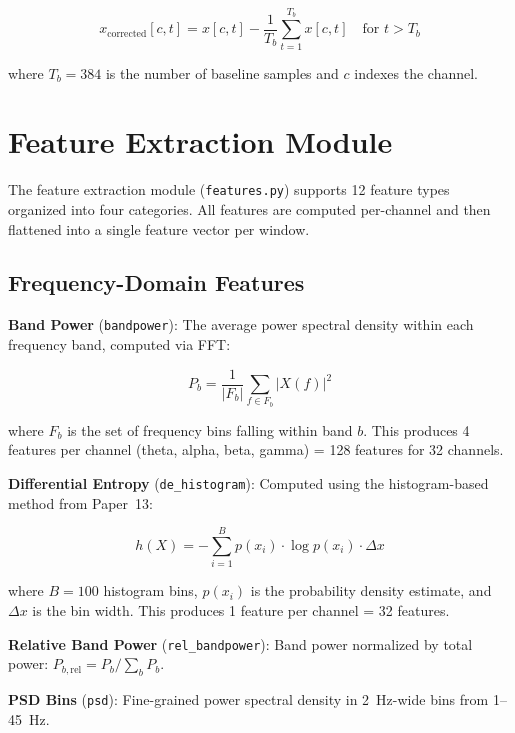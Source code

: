 \documentclass[12pt,a4paper]{report}
\begin{document}
\begin{equation}
    x_{\text{corrected}}[c, t] = x[c, t] - \frac{1}{T_b}\sum_{t=1}^{T_b} x[c, t]
    \quad \text{for } t > T_b
\end{equation}

\noindent where $T_b = 384$ is the number of baseline samples and $c$ indexes
the channel.


\section{Feature Extraction Module}
\label{sec:features}

The feature extraction module (\texttt{features.py}) supports 12 feature types
organized into four categories. All features are computed per-channel and then
flattened into a single feature vector per window.

\subsection{Frequency-Domain Features}

\textbf{Band Power} (\texttt{bandpower}): The average power spectral density
within each frequency band, computed via FFT:

\begin{equation}
    P_b = \frac{1}{|F_b|}\sum_{f \in F_b} |X(f)|^2
\end{equation}

\noindent where $F_b$ is the set of frequency bins falling within band $b$.
This produces 4 features per channel (theta, alpha, beta, gamma) = 128
features for 32 channels.

\textbf{Differential Entropy} (\texttt{de\_histogram}): Computed using the
histogram-based method from Paper~13:

\begin{equation}
    h(X) = -\sum_{i=1}^{B} p(x_i) \cdot \log p(x_i) \cdot \Delta x
    \label{eq:de}
\end{equation}

\noindent where $B=100$ histogram bins, $p(x_i)$ is the probability density
estimate, and $\Delta x$ is the bin width. This produces 1 feature per channel
= 32 features.

\textbf{Relative Band Power} (\texttt{rel\_bandpower}): Band power normalized
by total power: $P_{b,\text{rel}} = P_b / \sum_b P_b$.

\textbf{PSD Bins} (\texttt{psd}): Fine-grained power spectral density in
2~Hz-wide bins from 1--45~Hz.
\end{document}
